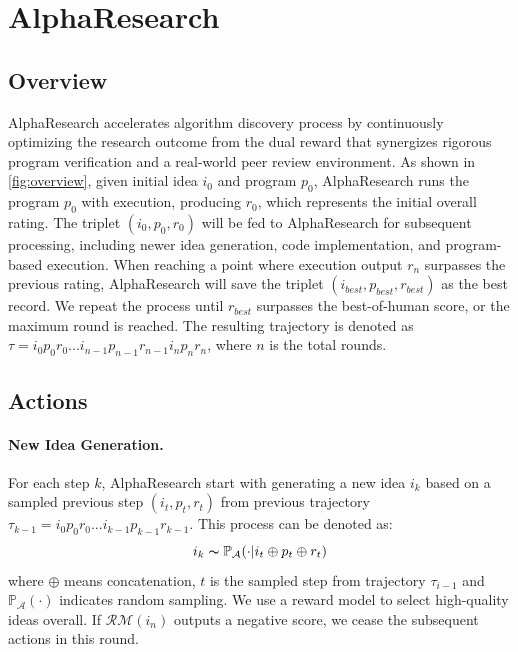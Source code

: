 
\section{AlphaResearch}




\subsection{Overview}


AlphaResearch accelerates algorithm discovery process by continuously optimizing the research outcome from the dual reward that synergizes rigorous program verification and a real-world peer review environment. 
As shown in \autoref{fig:overview}, given initial idea $i_0$ and program $p_0$, AlphaResearch runs the program $p_0$ with execution, producing $r_0$, which represents the initial overall rating. The triplet $(i_0, p_0, r_0)$ will be fed to AlphaResearch for subsequent processing, including newer idea generation, code implementation, and program-based execution. When reaching a point where execution output $r_n$ surpasses the previous rating, AlphaResearch will save the triplet $(i_{best}, p_{best}, r_{best})$ as the best record. We repeat the process until $r_{best}$ surpasses the best-of-human score, or the maximum round is reached. The resulting trajectory is denoted as $\tau = i_0p_0r_0...i_{n-1}p_{n-1}r_{n-1}i_{n}p_{n}r_{n}$, where $n$ is the total rounds.


\subsection{Actions}    
\paragraph{New Idea Generation.} For each step $k$, AlphaResearch start with generating a new idea $i_k$ based on a sampled previous step  $(i_{t}, p_{t}, r_{t})$ from previous trajectory $\tau_{k-1}=i_0p_0r_0...i_{k-1}p_{k-1}r_{k-1}$. This process can be denoted as:
\begin{equation}
i_k\thicksim\mathbb{P}_\mathcal{A}(\cdot|i_{t}\oplus p_{t}\oplus r_{t})
\end{equation}
where $\oplus$ means concatenation, $t$ is the sampled step from trajectory $\tau_{i-1}$ and $\mathbb{P}_\mathcal{A}(·)$ indicates random sampling. We use a reward model to select high-quality ideas overall. If $\mathcal{RM}(i_n)$ outputs a negative score, we cease the subsequent actions in this round.

